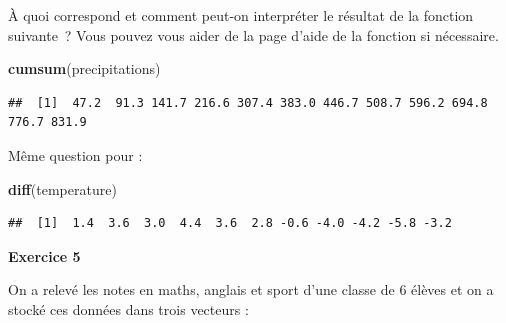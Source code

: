 \documentclass[12pt,]{book}
\newenvironment{Shaded}{\begin{snugshade}}{\end{snugshade}}
\newcommand{\KeywordTok}[1]{\textcolor[rgb]{0.27,0.27,0.27}{\textbf{#1}}}
\newcommand{\NormalTok}[1]{#1}
\begin{document}

À quoi correspond et comment peut-on interpréter le résultat de la fonction suivante~? Vous pouvez vous aider de la page d'aide de la fonction si nécessaire.

\begin{Shaded}
\begin{Highlighting}[]
\KeywordTok{cumsum}\NormalTok{(precipitations)}
\end{Highlighting}
\end{Shaded}

\begin{verbatim}
##  [1]  47.2  91.3 141.7 216.6 307.4 383.0 446.7 508.7 596.2 694.8 776.7 831.9
\end{verbatim}

Même question pour :

\begin{Shaded}
\begin{Highlighting}[]
\KeywordTok{diff}\NormalTok{(temperature)}
\end{Highlighting}
\end{Shaded}

\begin{verbatim}
##  [1]  1.4  3.6  3.0  4.4  3.6  2.8 -0.6 -4.0 -4.2 -5.8 -3.2
\end{verbatim}

\textbf{Exercice 5}

On a relevé les notes en maths, anglais et sport d'une classe de 6 élèves et on a stocké ces données dans trois vecteurs :
\end{document}
